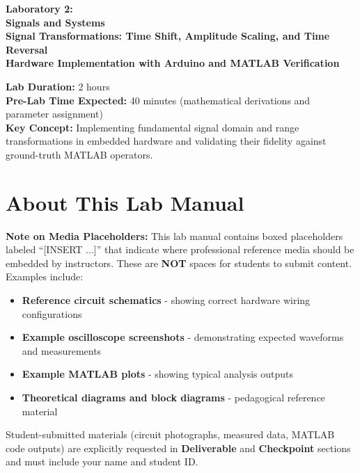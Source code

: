 \documentclass[11pt,letterpaper]{article}
\begin{document}
\begin{center}
\huge{\bf Laboratory 2:}\\
\vspace{0.2in}
\Large{\bf Signals and Systems}\\
\Large{\bf Signal Transformations: Time Shift, Amplitude Scaling, and Time Reversal}\\
\vspace{0.2in}
\normalsize{\bf Hardware Implementation with Arduino and MATLAB Verification}
\end{center}

\vspace{0.3in}
\noindent
\textbf{Lab Duration:} 2 hours\\
\textbf{Pre-Lab Time Expected:} 40 minutes (mathematical derivations and parameter assignment)\\
\textbf{Key Concept:} Implementing fundamental signal domain and range transformations in embedded hardware and validating their fidelity against ground-truth MATLAB operators.

\tableofcontents
\clearpage

\section*{About This Lab Manual}

\textbf{Note on Media Placeholders:} This lab manual contains boxed placeholders labeled ``[INSERT ...]'' that indicate where professional reference media should be embedded by instructors. These are \textbf{NOT} spaces for students to submit content. Examples include:

\begin{itemize}
    \item \textbf{Reference circuit schematics} - showing correct hardware wiring configurations
    \item \textbf{Example oscilloscope screenshots} - demonstrating expected waveforms and measurements
    \item \textbf{Example MATLAB plots} - showing typical analysis outputs
    \item \textbf{Theoretical diagrams and block diagrams} - pedagogical reference material
\end{itemize}

\noindent Student-submitted materials (circuit photographs, measured data, MATLAB code outputs) are explicitly requested in \textbf{Deliverable} and \textbf{Checkpoint} sections and must include your name and student ID.
\end{document}
